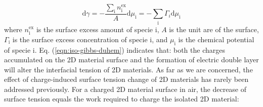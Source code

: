 \documentclass[aps,prl,reprint,groupedaddress,amsmath,amssymb, showpacs]{revtex4-1}
\begin{document}
\begin{equation}
\label{eqn:iso-gibbs-duhem}
\displaystyle
\mathrm{d}\gamma = -\frac{\sum_{\mathrm{i}} n_{\mathrm{i}}^{\mathrm{ex}}}{A} \mathrm{d} \mu_{\mathrm{i}} 
                 = -\sum_{\mathrm{i}} \Gamma_{i} \mathrm{d} \mu_{\mathrm{i}}
\end{equation}
where \(n_{\mathrm{i}}^{\mathrm{ex}}\) is the surface excess amount of
specie i, \(A\) is the unit are of the surface, \(\Gamma_{\mathrm{i}}\) is
the surface excess concentration of specie i, and \(\mu_{\mathrm{i}}\)
is the chemical potential of specie i. Eq. (\ref{eqn:iso-gibbs-duhem})
indicates that: both the charges accumulated on the 2D material
surface and the formation of electric double layer will alter the
interfacial tension of 2D materials. As far as we are concerned, the
effect of charge-induced surface tension change of 2D materials has
rarely been addressed previously. For a charged 2D material surface in
air, the decrease of surface tension equals the work required to
charge the isolated 2D material:
\end{document}
